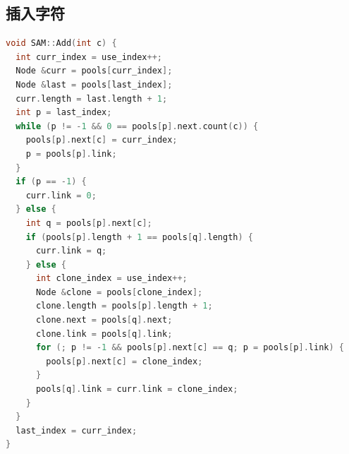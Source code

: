 \documentclass{article}
\begin{document}
\subsection{插入字符}
\begin{lstlisting}[language=C++, caption={Insert}]
void SAM::Add(int c) {
  int curr_index = use_index++;
  Node &curr = pools[curr_index];
  Node &last = pools[last_index];
  curr.length = last.length + 1;
  int p = last_index;
  while (p != -1 && 0 == pools[p].next.count(c)) {
    pools[p].next[c] = curr_index;
    p = pools[p].link;
  }
  if (p == -1) {
    curr.link = 0;
  } else {
    int q = pools[p].next[c];
    if (pools[p].length + 1 == pools[q].length) {
      curr.link = q;
    } else {
      int clone_index = use_index++;
      Node &clone = pools[clone_index];
      clone.length = pools[p].length + 1;
      clone.next = pools[q].next;
      clone.link = pools[q].link;
      for (; p != -1 && pools[p].next[c] == q; p = pools[p].link) {
        pools[p].next[c] = clone_index;
      }
      pools[q].link = curr.link = clone_index;
    }
  }
  last_index = curr_index;
}
\end{lstlisting}
\end{document}
